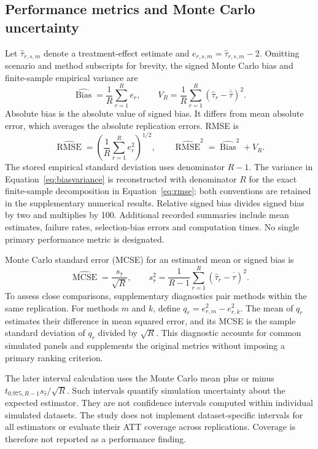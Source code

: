 \documentclass[11pt,a4paper]{article}
\begin{document}
\subsection{Performance metrics and Monte Carlo uncertainty}
Let $\widehat\tau_{r,s,m}$ denote a treatment-effect estimate and $e_{r,s,m}=\widehat\tau_{r,s,m}-2$. Omitting scenario and method subscripts for brevity, the signed Monte Carlo bias and finite-sample empirical variance are
\begin{equation}\label{eq:biasvariance}
\widehat{\operatorname{Bias}}=\frac{1}{R}\sum_{r=1}^{R}e_r,
\qquad V_R=\frac{1}{R}\sum_{r=1}^{R}(\widehat\tau_r-\overline{\widehat\tau})^2.
\end{equation}
Absolute bias is the absolute value of signed bias. It differs from mean absolute error, which averages the absolute replication errors. RMSE is
\begin{equation}\label{eq:rmse}
\widehat{\operatorname{RMSE}}=\left(\frac{1}{R}\sum_{r=1}^{R}e_r^2\right)^{1/2},
\qquad \widehat{\operatorname{RMSE}}^2=\widehat{\operatorname{Bias}}^2+V_R.
\end{equation}
The stored empirical standard deviation uses denominator $R-1$. The variance in Equation~\ref{eq:biasvariance} is reconstructed with denominator $R$ for the exact finite-sample decomposition in Equation~\ref{eq:rmse}; both conventions are retained in the supplementary numerical results. Relative signed bias divides signed bias by two and multiplies by 100. Additional recorded summaries include mean estimates, failure rates, selection-bias errors and computation times. No single primary performance metric is designated.

Monte Carlo standard error (MCSE) for an estimated mean or signed bias is
\begin{equation}\label{eq:mcse}
\widehat{\operatorname{MCSE}}=\frac{s_{\widehat\tau}}{\sqrt R},
\qquad s_{\widehat\tau}^2=\frac{1}{R-1}\sum_{r=1}^{R}(\widehat\tau_r-\overline{\widehat\tau})^2.
\end{equation}
To assess close comparisons, supplementary diagnostics pair methods within the same replication. For methods $m$ and $k$, define $q_r=e_{r,m}^2-e_{r,k}^2$. The mean of $q_r$ estimates their difference in mean squared error, and its MCSE is the sample standard deviation of $q_r$ divided by $\sqrt R$. This diagnostic accounts for common simulated panels and supplements the original metrics without imposing a primary ranking criterion.

The later interval calculation uses the Monte Carlo mean plus or minus $t_{0.975,R-1}s_{\widehat\tau}/\sqrt R$. Such intervals quantify simulation uncertainty about the expected estimator. They are not confidence intervals computed within individual simulated datasets. The study does not implement dataset-specific intervals for all estimators or evaluate their ATT coverage across replications. Coverage is therefore not reported as a performance finding.
\end{document}
